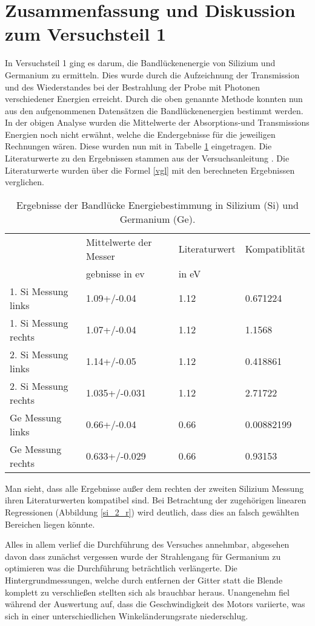 \section{Zusammenfassung und Diskussion zum Versuchsteil 1}
In Versuchsteil 1 ging es darum, die Bandlückenenergie von Silizium und Germanium zu ermitteln. Dies wurde durch die Aufzeichnung der Transmission und des Wiederstandes bei der Bestrahlung der Probe mit Photonen verschiedener Energien erreicht. Durch die oben genannte Methode konnten nun aus den aufgenommenen Datensätzen  die Bandlückenenergien bestimmt werden. In der obigen Analyse wurden die Mittelwerte der Absorptions-und Transmissions Energien noch nicht erwähnt, welche die Endergebnisse für die jeweiligen Rechnungen wären. Diese wurden nun mit in Tabelle \ref{ende_v1} eingetragen. 
Die Literaturwerte zu den Ergebnissen stammen aus der Versuchsanleitung \cite{anleitung}. Die Literaturwerte wurden über die Formel \ref{vgl} mit den berechneten Ergebnissen verglichen. 
\FloatBarrier
\begin{table}[ht]
	\centering
	\caption[Ergebnisse V1]{Ergebnisse der Bandlücke Energiebestimmung in Silizium (Si) und Germanium (Ge).}
	\label{ende_v1}
	\begin{tabular}{llll}
		\toprule
		{} & Mittelwerte der Messer & Literaturwert& Kompatiblität \\
		{} & gebnisse in ev & in eV & \\
		\midrule
		1. Si Messung links  &                          1.09+/-0.04 &                1.12 &      0.671224 \\
		1. Si Messung rechts &                          1.07+/-0.04 &                1.12 &        1.1568 \\
		2. Si Messung links  &                          1.14+/-0.05 &                1.12 &      0.418861 \\
		2. Si Messung rechts &                        1.035+/-0.031 &                1.12 &       2.71722 \\
		Ge Messung links     &                          0.66+/-0.04 &                0.66 &    0.00882199 \\
		Ge Messung rechts    &                        0.633+/-0.029 &                0.66 &       0.93153 \\
		\bottomrule
	\end{tabular}
\end{table}
\FloatBarrier
Man sieht, dass alle Ergebnisse außer dem rechten der zweiten Silizium Messung ihren Literaturwerten kompatibel sind. Bei Betrachtung der zugehörigen linearen Regressionen (Abbildung \ref{si_2_r}) wird deutlich, dass dies an falsch gewählten Bereichen liegen könnte. \par 
Alles in allem verlief die Durchführung des Versuches annehmbar, abgesehen davon dass zunächst vergessen wurde der Strahlengang für Germanium zu optimieren was die Durchführung beträchtlich verlängerte. Die Hintergrundmessungen, welche durch entfernen der Gitter statt die Blende komplett zu verschließen stellten sich als brauchbar heraus. Unangenehm fiel während der Auswertung auf, dass die Geschwindigkeit des Motors variierte, was sich in einer unterschiedlichen Winkeländerungsrate niederschlug.